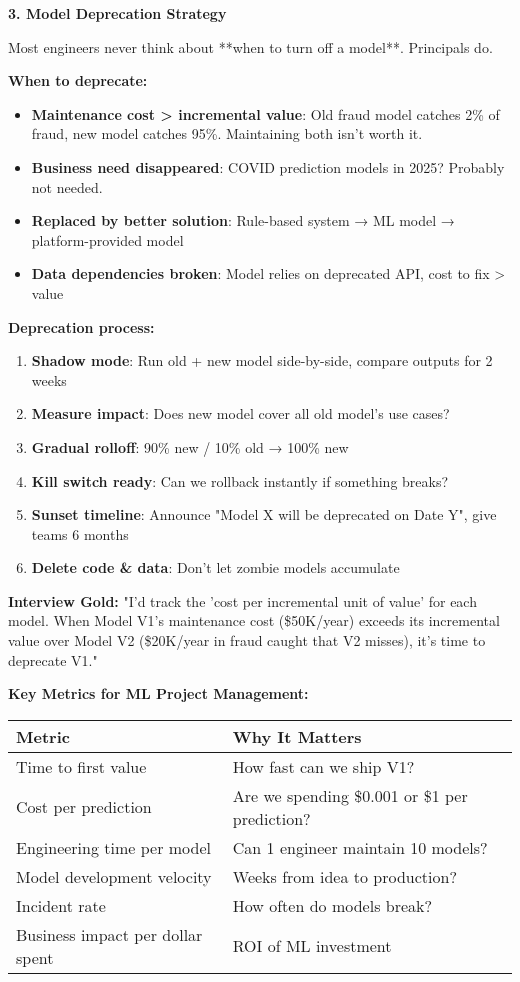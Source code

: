 \documentclass[10pt]{article}
\begin{document}
\textbf{3. Model Deprecation Strategy}

Most engineers never think about **when to turn off a model**. Principals do.

\textbf{When to deprecate:}
\begin{itemize}
\item \textbf{Maintenance cost > incremental value}: Old fraud model catches 2\% of fraud, new model catches 95\%. Maintaining both isn't worth it.
\item \textbf{Business need disappeared}: COVID prediction models in 2025? Probably not needed.
\item \textbf{Replaced by better solution}: Rule-based system → ML model → platform-provided model
\item \textbf{Data dependencies broken}: Model relies on deprecated API, cost to fix > value
\end{itemize}

\textbf{Deprecation process:}
\begin{enumerate}
\item \textbf{Shadow mode}: Run old + new model side-by-side, compare outputs for 2 weeks
\item \textbf{Measure impact}: Does new model cover all old model's use cases?
\item \textbf{Gradual rolloff}: 90\% new / 10\% old → 100\% new
\item \textbf{Kill switch ready}: Can we rollback instantly if something breaks?
\item \textbf{Sunset timeline}: Announce "Model X will be deprecated on Date Y", give teams 6 months
\item \textbf{Delete code \& data}: Don't let zombie models accumulate
\end{enumerate}

\textbf{Interview Gold:} "I'd track the 'cost per incremental unit of value' for each model. When Model V1's maintenance cost (\$50K/year) exceeds its incremental value over Model V2 (\$20K/year in fraud caught that V2 misses), it's time to deprecate V1."

\textbf{Key Metrics for ML Project Management:}

\begin{tabular}{|l|l|}
\hline
\textbf{Metric} & \textbf{Why It Matters} \\
\hline
Time to first value & How fast can we ship V1? \\
Cost per prediction & Are we spending \$0.001 or \$1 per prediction? \\
Engineering time per model & Can 1 engineer maintain 10 models? \\
Model development velocity & Weeks from idea to production? \\
Incident rate & How often do models break? \\
Business impact per dollar spent & ROI of ML investment \\
\hline
\end{tabular}
\end{document}
